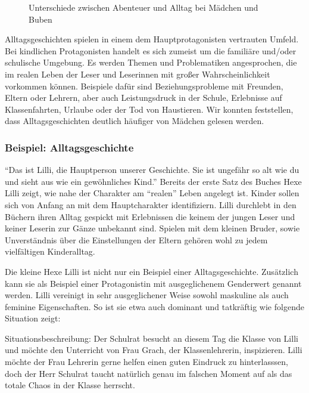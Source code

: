\begin{figure}
\center
  \label{tab-abenteuer}
  \small

  \caption[Unterschiede zwischen Abenteuer und Alltag]{Unterschiede zwischen Abenteuer und Alltag bei Mädchen und Buben}
\end{figure}

Alltagsgeschichten spielen in einem dem Hauptprotagonisten vertrauten
Umfeld. Bei kindlichen Protagonisten handelt es sich zumeist um die
familiäre und/oder schulische Umgebung. Es werden Themen und
Problematiken angesprochen, die im realen Leben der Leser und Leserinnen
mit großer Wahrscheinlichkeit vorkommen können. Beispiele dafür sind
Beziehungsprobleme mit Freunden, Eltern oder Lehrern, aber auch
Leistungsdruck in der Schule, Erlebnisse auf Klassenfahrten, Urlaube
oder der Tod von Haustieren. Wir konnten feststellen, dass
Alltagsgeschichten deutlich häufiger von Mädchen gelesen werden.

\subsubsection{Beispiel: Alltagsgeschichte}

``Das ist Lilli, die Hauptperson unserer Geschichte. Sie ist ungefähr so
alt wie du und sieht aus wie ein gewöhnliches Kind.''
\parencite[][6]{KNISTER1999} Bereits der erste Satz des Buches Hexe
Lilli zeigt, wie nahe der Charakter am ``realen'' Leben angelegt ist.
Kinder sollen sich von Anfang an mit dem Hauptcharakter identifiziern.
Lilli durchlebt in den Büchern ihren Alltag gespickt mit Erlebnissen die
keinem der jungen Leser und keiner Leserin zur Gänze unbekannt sind.
Spielen mit dem kleinen Bruder, sowie Unverständnis über die
Einstellungen der Eltern gehören wohl zu jedem vielfältigen
Kinderalltag.

Die kleine Hexe Lilli ist nicht nur ein Beispiel einer
Alltagsgeschichte. Zusätzlich kann sie als Beispiel einer Protagonistin
mit ausgeglichenem Genderwert genannt werden. Lilli vereinigt in sehr
ausgeglichener Weise sowohl maskuline als auch feminine Eigenschaften.
So ist sie etwa auch dominant und tatkräftig wie folgende Situation
zeigt:

Situationsbeschreibung: Der Schulrat besucht an diesem Tag die Klasse
von Lilli und möchte den Unterricht von Frau Grach, der Klassenlehrerin,
inspizieren. Lilli möchte der Frau Lehrerin gerne helfen einen guten
Eindruck zu hinterlasssen, doch der Herr Schulrat taucht natürlich genau
im falschen Moment auf als das totale Chaos in der Klasse herrscht.

